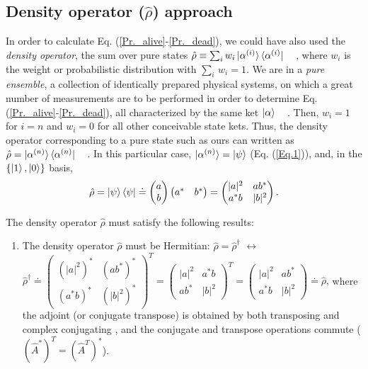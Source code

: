\documentclass[11pt]{article}
\numberwithin{equation}{section} %
\numberwithin{figure}{section} %
\begin{document}
\begin{appendices}
\subsection{Density operator ($\hat{\rho}$) approach } \label{density_operator_approach}
In order to calculate Eq. (\ref{Pr._alive}-\ref{Pr._dead}), we could have also used the \emph{density operator}, the sum over pure states $\hat{\rho}\equiv\sum_iw_i\ket{\alpha^{(i)}}\bra{\alpha^{(i)}}$  $\,\,\,$   \cite[p.~181, Eq.~(3.4.7)]{Sakurai}, where $w_i$ is the weight or probabilistic distribution with $\sum_i\,w_i=1$. We are in a \emph{pure ensemble}, a collection of identically prepared physical systems, on which a great number of measurements are to be performed in order to determine Eq. (\ref{Pr._alive}-\ref{Pr._dead}), all characterized by the same ket $\ket{\alpha}$ $\,\,\,$ \cite[p.~24, l.~12-15]{Sakurai}. Then, $w_i=1$ for $i=n$ and $w_i=0$ for all other conceivable state kets. Thus, the density operator corresponding to a pure state such as ours can written as $\hat{\rho}=\ket{\alpha^{(n)}}\bra{\alpha^{(n)}}$  $\,\,\,$  \cite[p.~182, Eq.~(3.4.12)]{Sakurai}. In this particular case, $\ket{\alpha^{(n)}}=\ket{\psi}$ (Eq. (\ref{Eq.1})), and, in the $\{\ket{1},\ket{0}\}$ basis,
\begin{equation} \label{eq2.4}
\hat{\rho}=\ket{\psi}\bra{\psi}\doteq\begin{pmatrix} a \\ b \end{pmatrix}\begin{pmatrix} a^*&b^*  \end{pmatrix}=\begin{pmatrix} |a|^2&ab^* \\ a^*b&|b|^2 \end{pmatrix}\textrm{.}
\end{equation}

The density operator $\hat{\rho}$ must satisfy the following results: \cite[p.~134, Eq.~(4.2.23.1-3)]{Shankar} \cite[p.~101, Theo.~2.5]{Shankar}
\begin{enumerate}
\item The density operator $\hat{\rho}$ must be Hermitian: $\hat{\rho}=\hat{\rho}^\dagger$ $\leftrightarrow$ $\hat{\rho}^\dagger\doteq \begin{pmatrix} (|a|^2)^*&(ab^*)^* \\ (a^*b)^*&(|b|^2)^* \end{pmatrix}^T=\begin{pmatrix} |a|^2&a^*b \\ ab^*&|b|^2 \end{pmatrix}^T =\begin{pmatrix} |a|^2&ab^* \\ a^*b&|b|^2 \end{pmatrix}\doteq\hat{\rho}\textrm{,}$ where the adjoint (or conjugate transpose) is obtained by both transposing and complex conjugating \cite[p.~18, l.~28]{Nielsen}, and the conjugate and transpose operations commute ($(\hat{A}^*)^T=(\hat{A}^T)^*$).\\


\end{enumerate}
\end{appendices}
\end{document}
